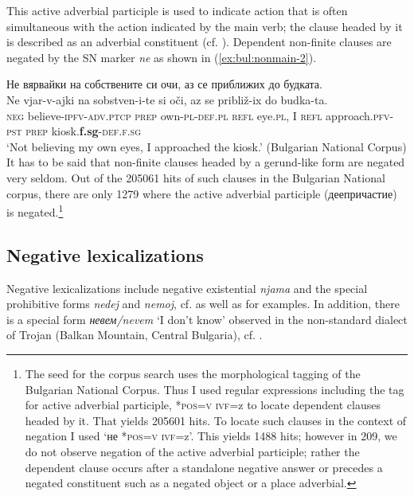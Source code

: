 \documentclass[output=paper,colorlinks=true, citecolor=brown]{langscibook}
\begin{document}
This active adverbial participle is used to indicate action that is often simultaneous with the action indicated by the main verb; the clause headed by it is described as an adverbial constituent (cf. \citealt[238--239]{PopovEtAl1983Synt}). Dependent non-finite clauses are negated by the SN marker \textit{ne} as shown in (\ref{ex:bul:nonmain-2}).

\ea  Не вярвайки на собствените си очи, аз се приближих до будката.\\ \label{ex:bul:nonmain-2}
  	\gll Ne vjar-v-ajki na sobstven-i-te si oči, az se približ-ix do budka-ta.\\
        \textsc{neg} believe-\textsc{ipfv}-\textsc{adv.ptcp} \textsc{prep} own-\textsc{pl}-\textsc{def.pl} \textsc{refl} eye.\textsc{pl}, I \textsc{refl} approach.\textsc{pfv}-\textsc{pst} \textsc{prep} kiosk.\textbf{f.sg}-\textsc{def.f.sg}\\
    \glt `Not believing my own eyes, I approached the kiosk.' (Bulgarian National Corpus)
\z
It has to be said that non-finite clauses headed by a gerund-like form are negated very seldom. Out of the 205061 hits of such clauses in the Bulgarian National corpus, there are only 1279 where the active adverbial participle (деепричастие) is negated.\footnote{The seed for the corpus search uses the morphological tagging of the Bulgarian National Corpus. Thus I used regular expressions including the tag for  active adverbial participle, *\textsc{pos=v ivf}=z to locate dependent clauses headed by it. That yields 205601 hits. To locate such clauses in the context of negation I used `не *\textsc{pos=v ivf}=z'. This yields 1488 hits; however in 209, we do not observe negation of the active adverbial participle; rather the dependent clause occurs after a standalone negative answer or precedes a negated constituent such as a negated object or a place adverbial.}

\subsection{Negative lexicalizations}\label{sec:bul:l}
Negative lexicalizations include negative existential \textit{njama} and the special prohibitive forms \textit{nedej} and \textit{nemoj}, cf.  as well as  for examples. In addition, there is a special form \textit{невем/nevem} `I don't know' observed in the non-standard dialect of Trojan (Balkan Mountain, Central Bulgaria), cf. \href{https://ibl.bas.bg/lib/ber_4_000-1004/#page/585/mode/1up}{\citet[v.4:585]{GeorgievIlčev1971}}. 
\end{document}
